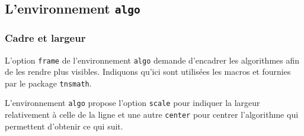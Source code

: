 \documentclass[12pt,a4paper]{article}
\begin{document}

\subsection{L'environnement \texttt{algo}}

\subsubsection{Cadre et largeur}

L'option \verb#frame# de l'environnement \verb#algo# demande d'encadrer les algorithmes afin de les rendre plus visibles.
Indiquons qu'ici sont utilisées les macros  et  fournies par le package \verb#tnsmath#.



L'environnement \verb#algo# propose l'option \verb#scale# pour indiquer la largeur relativement à celle de la ligne et une autre \verb#center# pour centrer l'algorithme qui permettent d'obtenir ce qui suit.

\vspace{-1em}
\end{document}
